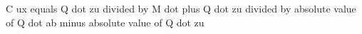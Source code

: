 C ux equals Q dot zu divided by M dot plus Q dot zu divided by absolute value of Q dot ab minus absolute value of Q dot zu